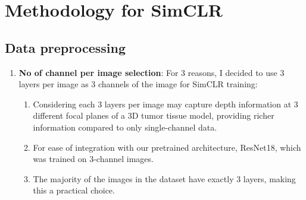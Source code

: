 \chapter{Methodology for SimCLR}\label{ch: Methodology for SimCLR}
\section{Data preprocessing} \label{sec:data preprocessing}
\begin{enumerate}
  \item \textbf{No of channel per image selection}:
   For 3 reasons, I decided to use 3 layers per image as 3 channels of the image for SimCLR training:
   \begin{enumerate}[itemsep=0pt]
    \item Considering each 3 layers per image may capture depth information at 3 different focal planes of a 3D tumor tissue model, providing richer information compared to only single-channel data.
    \item For ease of integration with our pretrained architecture, ResNet18, which was trained on 3-channel images.
    \item The majority of the images in the dataset have exactly 3 layers, making this a practical choice.
  \end{enumerate}
  

\end{enumerate}

